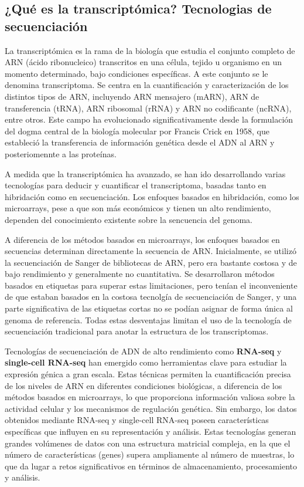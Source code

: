 \subsection{¿Qué es la transcriptómica? Tecnologias de secuenciación}

La transcriptómica es la rama de la biología que estudia el conjunto completo de ARN (ácido ribonucleico) transcritos en una
célula, tejido u organismo en un momento determinado, bajo condiciones específicas. A este conjunto se le denomina transcriptoma. Se centra en la cuantificación y caracterización
de los distintos tipos de ARN, incluyendo ARN mensajero (mARN), ARN de transferencia (tRNA), ARN ribosomal (rRNA) y ARN 
no codificante (ncRNA), entre otros. Este campo ha evolucionado significativamente desde la formulación del dogma central de la biología molecular por Francis Crick
en 1958, que estableció la transferencia de información genética desde el ADN al ARN y posteriomennte a las proteínas. \newline

A medida que la transcriptómica ha avanzado, se han ido desarrollando varias tecnologías para deducir y cuantificar el transcriptoma, basadas
tanto en hibridación como en secuenciación. Los enfoques basados en hibridación, como los microarrays, pese a que son más económicos y 
tienen un alto rendimiento, dependen del conocimiento existente sobre la sencuencia del genoma. \newline

A diferencia de los métodos basados en microarrays, los enfoques basados en secuencias determinan directamente la secuencia de ARN. Inicialmente, se utilizó
la secuenciación de Sanger de bibliotecas de ARN, pero era bastante costosa y de bajo rendimiento y generalmente no cuantitativa. Se 
desarrollaron métodos basados en etiquetas para superar estas limitaciones, pero tenían el inconveniente de que estaban basados en la 
costosa tecnolgía de secuenciación de Sanger, y una parte significativa de las etiquetas cortas no se podían asignar de forma única al
genoma de referencia. Todas estas desventajas limitan el uso de la tecnología de secuenciación tradicional para anotar la estructura de los 
transcriptomas. \newline    


Tecnologías de secuenciación de ADN de alto rendimiento como \textbf{RNA-seq} y \textbf{single-cell RNA-seq} han emergido como herramientas 
clave para estudiar la expresión génica a gran escala. Estas técnicas permiten la cuantificación precisa de los niveles de ARN en diferentes 
condiciones biológicas, a diferencia de los métodos basados en microarrays, lo que proporciona información valiosa sobre la actividad celular 
y los mecanismos de regulación genética. Sin embargo, los datos obtenidos mediante RNA-seq y single-cell RNA-seq poseen características 
específicas que influyen en su representación y análisis. Estas tecnologías generan grandes volúmenes de datos con una estructura 
matricial compleja, en la que el número de características (genes) supera ampliamente al número de muestras, lo que da lugar a retos 
significativos en términos de almacenamiento, procesamiento y análisis.


